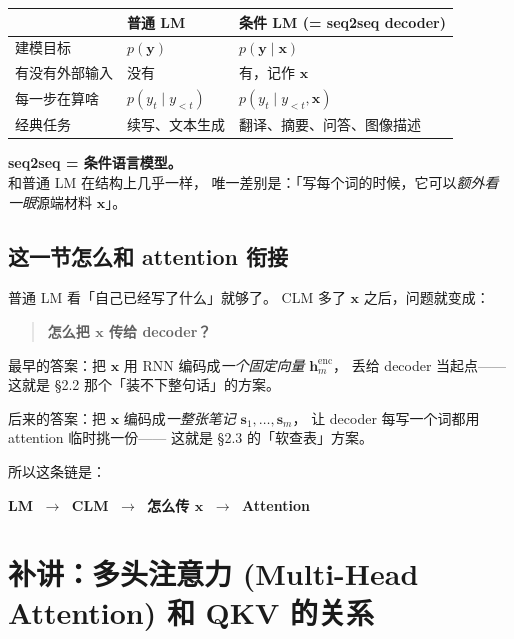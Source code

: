 \documentclass[11pt,a4paper]{ctexart}
\newcommand{\vect}[1]{\boldsymbol{#1}}
\begin{document}
\begin{center}
\renewcommand{\arraystretch}{1.25}
\begin{tabular}{@{}p{3.5cm} p{4.5cm} p{5cm}@{}}
\toprule
 & 普通 LM & 条件 LM (= seq2seq decoder) \\
\midrule
建模目标            & $p(\vect{y})$              & $p(\vect{y} \mid \vect{x})$ \\
有没有外部输入       & 没有                        & 有，记作 $\vect{x}$ \\
每一步在算啥         & $p(y_t \mid y_{<t})$       & $p(y_t \mid y_{<t}, \vect{x})$ \\
经典任务            & 续写、文本生成              & 翻译、摘要、问答、图像描述 \\
\bottomrule
\end{tabular}
\end{center}

\begin{keypointblock}
\textbf{seq2seq = 条件语言模型。}\\
和普通 LM 在结构上几乎一样，
唯一差别是：「写每个词的时候，它可以\emph{额外看一眼}源端材料 $\vect{x}$」。
\end{keypointblock}

\subsection{这一节怎么和 attention 衔接}

普通 LM 看「自己已经写了什么」就够了。
CLM 多了 $\vect{x}$ 之后，问题就变成：

\begin{quote}
\textbf{怎么把 $\vect{x}$ 传给 decoder？}
\end{quote}

最早的答案：把 $\vect{x}$ 用 RNN 编码成\emph{一个固定向量}
$\vect{h}^{\text{enc}}_m$，
丢给 decoder 当起点——这就是 §2.2 那个「装不下整句话」的方案。

后来的答案：把 $\vect{x}$ 编码成\emph{一整张笔记}
$\vect{s}_1, \dots, \vect{s}_m$，
让 decoder 每写一个词都用 attention 临时挑一份——
这就是 §2.3 的「软查表」方案。

\medskip
所以这条链是：
\begin{center}
\textbf{LM} $\;\to\;$ \textbf{CLM} $\;\to\;$ \textbf{怎么传 $\vect{x}$} $\;\to\;$ \textbf{Attention}
\end{center}

\section{补讲：多头注意力 (Multi-Head Attention) 和 QKV 的关系}
\end{document}
